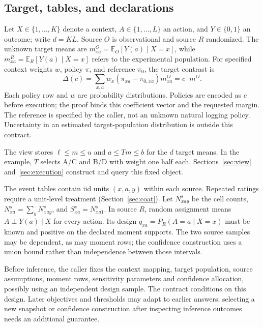 \documentclass[conference]{IEEEtran}
\newcommand{\E}{\mathbb{E}}
\begin{document}
\subsection{Target, tables, and declarations}
Let $X\in\{1,\ldots,K\}$ denote a context, $A\in\{1,\ldots,L\}$ an action, and $Y\in\{0,1\}$ an outcome; write $d=KL$. Source $O$ is observational and source $R$ randomized. The unknown target means are $m^O_{xa}=\E_O[Y(a)\mid X=x]$, while $m^R_{xa}=\E_R[Y(a)\mid X=x]$ refers to the experimental population. For specified context weights $w$, policy $\pi$, and reference $\pi_0$, the target contrast is
\begin{equation}
 \Delta(c)=\sum_{x,a}w_x(\pi_{xa}-\pi_{0,xa})m^O_{xa}=c^\top m^O.\label{eq:query}
\end{equation}
Each policy row and $w$ are probability distributions. Policies are encoded as $c$ before execution; the proof binds this coefficient vector and the requested margin. The reference is specified by the caller, not an unknown natural logging policy. Uncertainty in an estimated target-population distribution is outside this contract.

The view stores $\ell\le m\le u$ and $a\le Tm\le b$ for the $d$ target means. In the example, $T$ selects A/C and B/D with weight one half each. Sections~\ref{sec:view} and~\ref{sec:execution} construct and query this fixed object.

The event tables contain iid units $(x,a,y)$ within each source. Repeated ratings require a unit-level treatment (Section~\ref{sec:coat}). Let $N^s_{xay}$ be the cell counts, $N^s_{xa}=\sum_yN^s_{xay}$, and $S^s_{xa}=N^s_{xa1}$. In source $R$, random assignment means $A\perp Y(a)\mid X$ for every action. Its design $q_{xa}=P_R(A=a\mid X=x)$ must be known and positive on the declared moment supports. The two source samples may be dependent, as may moment rows; the confidence construction uses a union bound rather than independence between those intervals.

Before inference, the caller fixes the context mapping, target population, source assumptions, moment rows, sensitivity parameters and confidence allocation, possibly using an independent design sample. The contract conditions on this design. Later objectives and thresholds may adapt to earlier answers; selecting a new snapshot or confidence construction after inspecting inference outcomes needs an additional guarantee.
\end{document}
